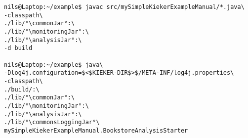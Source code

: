 \begin{lstlisting} 			
nils@Laptop:~/example$ javac src/mySimpleKiekerExampleManual/*.java\
-classpath\ 		
./lib/°\commonJar°:\
./lib/°\monitoringJar°:\
./lib/°\analysisJar°:\
-d build

nils@Laptop:~/example$ java\
-Dlog4j.configuration=$<$KIEKER-DIR$>$/META-INF/log4j.properties\
-classpath\ 	
./build/:\
./lib/°\commonJar°:\
./lib/°\monitoringJar°:\
./lib/°\analysisJar°:\
./lib/°\commonsLoggingJar°\
mySimpleKiekerExampleManual.BookstoreAnalysisStarter 
\end{lstlisting}	
